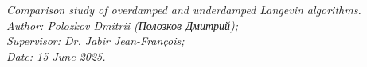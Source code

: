 \documentclass[12pt]{article}
\begin{document}
\hfill
\begin{center}
\textit{Comparison study of overdamped and underdamped Langevin algorithms.}\\
\textit{Author: Polozkov Dmitrii (Полозков Дмитрий);}\\
\textit{Supervisor: Dr. Jabir Jean-François;}\\
\textit{Date: 15 June 2025.}
\end{center}


\tableofcontents
\newpage
\end{document}
